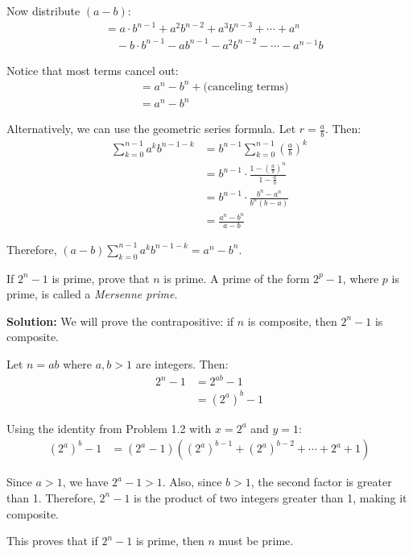 Now distribute $(a - b)$:
\begin{align*}
&= a \cdot b^{n-1} + a^2 b^{n-2} + a^3 b^{n-3} + \cdots + a^n \\
&\quad - b \cdot b^{n-1} - a b^{n-1} - a^2 b^{n-2} - \cdots - a^{n-1} b
\end{align*}

Notice that most terms cancel out:
\begin{align*}
&= a^n - b^n + \text{(canceling terms)} \\
&= a^n - b^n
\end{align*}

Alternatively, we can use the geometric series formula. Let $r = \frac{a}{b}$. Then:
\begin{align*}
\sum_{k=0}^{n-1} a^k b^{n-1-k} &= b^{n-1} \sum_{k=0}^{n-1} \left(\frac{a}{b}\right)^k \\
&= b^{n-1} \cdot \frac{1 - \left(\frac{a}{b}\right)^n}{1 - \frac{a}{b}} \\
&= b^{n-1} \cdot \frac{b^n - a^n}{b^n(b - a)} \\
&= \frac{a^n - b^n}{a - b}
\end{align*}

Therefore, $(a - b)\sum_{k=0}^{n-1} a^k b^{n-1-k} = a^n - b^n$.

\begin{problembox}
If $2^n - 1$ is prime, prove that $n$ is prime. A prime of the form $2^p - 1$, where $p$ is prime, is called a \textit{Mersenne prime}.
\end{problembox}

\textbf{Solution:}
We will prove the contrapositive: if $n$ is composite, then $2^n - 1$ is composite.

Let $n = ab$ where $a, b > 1$ are integers. Then:
\begin{align*}
2^n - 1 &= 2^{ab} - 1 \\
&= (2^a)^b - 1
\end{align*}

Using the identity from Problem 1.2 with $x = 2^a$ and $y = 1$:
\begin{align*}
(2^a)^b - 1 &= (2^a - 1)((2^a)^{b-1} + (2^a)^{b-2} + \cdots + 2^a + 1)
\end{align*}

Since $a > 1$, we have $2^a - 1 > 1$. Also, since $b > 1$, the second factor is greater than 1. Therefore, $2^n - 1$ is the product of two integers greater than 1, making it composite.

This proves that if $2^n - 1$ is prime, then $n$ must be prime.

